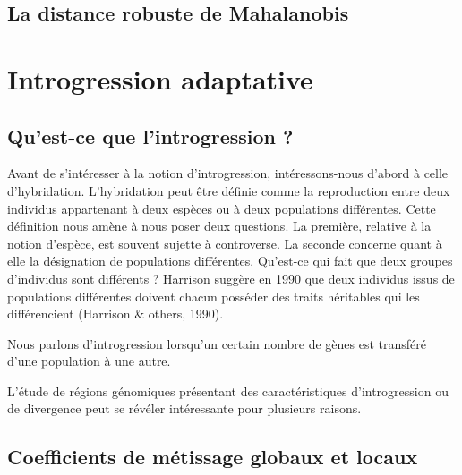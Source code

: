 \documentclass[12pt,twoside]{ugathesis}
\begin{document}
  \section{La distance robuste de
  Mahalanobis}\label{la-distance-robuste-de-mahalanobis}
  
  \newpage
  
  
  
  \newpage
  
  \chapter{Introgression adaptative}\label{introgression-adaptative-1}
  
  \section{Qu'est-ce que l'introgression
  ?}\label{quest-ce-que-lintrogression}
  
  Avant de s'intéresser à la notion d'introgression, intéressons-nous
  d'abord à celle d'hybridation. L'hybridation peut être définie comme la
  reproduction entre deux individus appartenant à deux espèces ou à deux
  populations différentes. Cette définition nous amène à nous poser deux
  questions. La première, relative à la notion d'espèce, est souvent
  sujette à controverse. La seconde concerne quant à elle la désignation
  de populations différentes. Qu'est-ce qui fait que deux groupes
  d'individus sont différents ? Harrison suggère en 1990 que deux
  individus issus de populations différentes doivent chacun posséder des
  traits héritables qui les différencient (Harrison \& others, 1990).
  
  Nous parlons d'introgression lorsqu'un certain nombre de gènes est
  transféré d'une population à une autre.
  
  L'étude de régions génomiques présentant des caractéristiques
  d'introgression ou de divergence peut se révéler intéressante pour
  plusieurs raisons.
  
  \section{Coefficients de métissage globaux et
  locaux}\label{coefficients-de-metissage-globaux-et-locaux}
  
\end{document}
